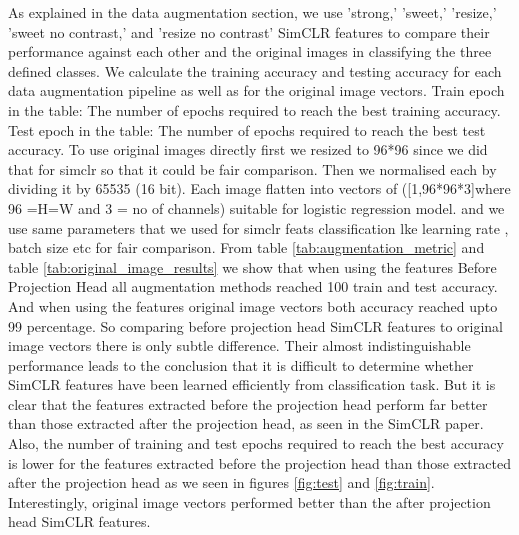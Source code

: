 As explained in the data augmentation section, we use 'strong,' 'sweet,' 'resize,' 'sweet no contrast,' and 'resize no contrast' SimCLR features to compare their performance against each other and the original images in classifying the three defined classes. We calculate the training accuracy and testing accuracy for each data augmentation pipeline as well as for the original image vectors. Train epoch in the table: The number of epochs required to reach the best training accuracy.
Test epoch in the table: The number of epochs required to reach the best test accuracy.
To use original images directly first we resized to 96*96 since we did that for simclr so that it could be fair comparison. Then we normalised each by dividing it by 65535 
(16 bit). Each image flatten into vectors of ([1,96*96*3]where 96 =H=W and 3 = no of channels) suitable for logistic regression model. and we use same parameters that we used 
for simclr feats classification lke learning rate , batch size etc for fair comparison.
From table \ref{tab:augmentation_metric} and table \ref{tab:original_image_results} we show that when using the features Before Projection Head all augmentation methods reached 100 train and test accuracy. And when using the features original image vectors both accuracy reached upto 99 percentage. So comparing before projection head SimCLR features to original image vectors there is only subtle difference. Their almost indistinguishable performance leads to the conclusion that it is difficult to determine whether SimCLR features have been learned efficiently from classification task. But it is clear that the features extracted before the projection head perform far better than those extracted after the projection head, as seen in the SimCLR \Cite{chen2020simple}paper. Also, the number of training and test epochs required to reach the best accuracy is lower for the features extracted before the projection head than those extracted after the projection head as we seen in figures \ref{fig:test} and \ref{fig:train}. Interestingly, original image vectors performed better than the after projection head SimCLR features.

